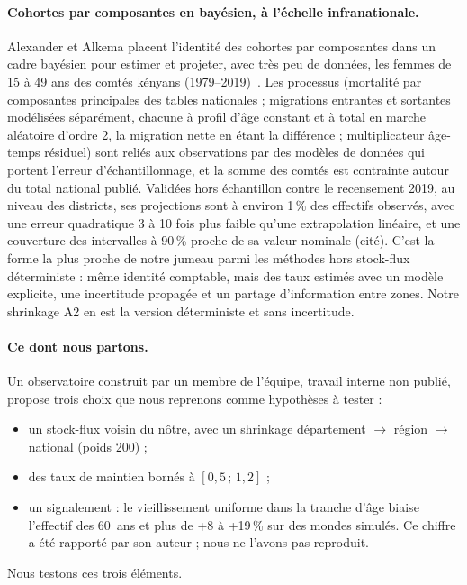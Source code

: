 \paragraph{Cohortes par composantes en bayésien, à l'échelle infranationale.} Alexander et Alkema
placent l'identité des cohortes par composantes dans un cadre bayésien pour estimer et projeter,
avec très peu de données, les femmes de 15 à 49 ans des comtés kényans
(1979--2019)~\cite{a2-alexander2021bayesian}. Les processus (mortalité par composantes principales des
tables nationales ; migrations entrantes et sortantes modélisées séparément, chacune à profil d'âge
constant et à total en marche aléatoire d'ordre 2, la migration nette en étant la différence ;
multiplicateur âge-temps résiduel) sont reliés aux observations par
des modèles de données qui portent l'erreur d'échantillonnage, et la somme des comtés est contrainte
autour du total national publié. Validées hors échantillon contre le recensement 2019, au niveau
des districts, ses projections sont à environ 1\,\% des effectifs observés, avec une erreur quadratique 3 à 10 fois
plus faible qu'une extrapolation linéaire, et une couverture des intervalles à 90\,\% proche de sa
valeur nominale (cité). C'est la forme la plus proche de notre jumeau parmi les méthodes hors
stock-flux déterministe : même identité comptable, mais des taux estimés avec un modèle explicite,
une incertitude propagée et un partage d'information entre zones. Notre shrinkage A2 en est la
version déterministe et sans incertitude.

\paragraph{Ce dont nous partons.} Un observatoire construit par un membre de
l'équipe, travail interne non publié, propose trois choix que nous reprenons comme hypothèses à
tester :
\begin{itemize}
\item un stock-flux voisin du nôtre, avec un shrinkage département $\to$ région $\to$ national
  (poids 200) ;
\item des taux de maintien bornés à $[0{,}5\,;\,1{,}2]$ ;
\item un signalement : le vieillissement uniforme dans la tranche d'âge biaise l'effectif des
  60~ans et plus de +8 à +19\,\% sur des mondes simulés. Ce chiffre a été rapporté par son
  auteur ; nous ne l'avons pas reproduit.
\end{itemize}
Nous testons ces trois éléments.

